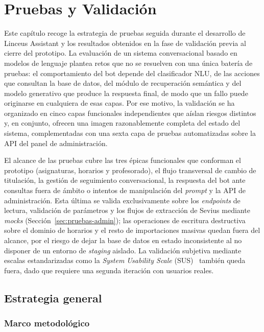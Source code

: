 
\chapter{Pruebas y Validación}\label{cap:pruebas}

Este capítulo recoge la estrategia de pruebas seguida durante el desarrollo de Linceus Assistant y los resultados obtenidos en la fase de validación previa al cierre del prototipo. La evaluación de un sistema conversacional basado en modelos de lenguaje plantea retos que no se resuelven con una única batería de pruebas: el comportamiento del bot depende del clasificador NLU, de las acciones que consultan la base de datos, del módulo de recuperación semántica y del modelo generativo que produce la respuesta final, de modo que un fallo puede originarse en cualquiera de esas capas. Por ese motivo, la validación se ha organizado en cinco capas funcionales independientes que aíslan riesgos distintos y, en conjunto, ofrecen una imagen razonablemente completa del estado del sistema, complementadas con una sexta capa de pruebas automatizadas sobre la API del panel de administración.

El alcance de las pruebas cubre las tres épicas funcionales que conforman el prototipo (asignaturas, horarios y profesorado), el flujo transversal de cambio de titulación, la gestión de seguimiento conversacional, la respuesta del bot ante consultas fuera de ámbito o intentos de manipulación del \textit{prompt} y la API de administración. Esta última se valida exclusivamente sobre los \textit{endpoints} de lectura, validación de parámetros y los flujos de extracción de Sevius mediante \textit{mocks} (Sección~\ref{sec:pruebas-admin}); las operaciones de escritura destructiva sobre el dominio de horarios y el resto de importaciones masivas quedan fuera del alcance, por el riesgo de dejar la base de datos en estado inconsistente al no disponer de un entorno de \textit{staging} aislado. La validación subjetiva mediante escalas estandarizadas como la \textit{System Usability Scale} (SUS)~\cite{brooke1996sus} también queda fuera, dado que requiere una segunda iteración con usuarios reales.

\section{Estrategia general}\label{sec:pruebas-estrategia}

\subsection{Marco metodológico}\label{subsec:pruebas-marco}

